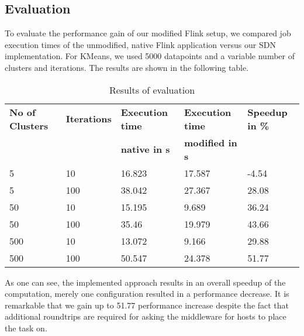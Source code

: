 \subsection{Evaluation}
To evaluate the performance gain of our modified Flink setup, we compared job execution times of the
unmodified, native Flink application versus our SDN implementation. For KMeans, we used 5000
datapoints and a variable number of clusters and iterations. The results are shown in the following
table.

\begin{table}[h]
    \centering
    \begin{tabular}{| l | l | l | l | l | }
        \hline
        \textbf{No of Clusters} & \textbf{Iterations} & \textbf{Execution time}
            & \textbf{Execution time} & \textbf{Speedup in \%} \\
        & & \textbf{native in s} & \textbf{modified in s} & \\ \hline

        5 & 10 & 16.823 & 17.587 & -4.54 \\ \hline
        5 & 100 & 38.042 & 27.367 & 28.08 \\ \hline
        50 &10 &15.195 &9.689 &36.24 \\ \hline
        50 &100 &35.46 &19.979 &43.66 \\ \hline
        500 &10 &13.072 &9.166 &29.88 \\ \hline
        500 &100 &50.547 &24.378 &51.77 \\ \hline
    \end{tabular}
    \caption{Results of evaluation}
    \label{table:guest_properties}
\end{table}

As one can see, the implemented approach results in an overall speedup of the computation, merely
one configuration resulted in a performance decrease. It is remarkable that we gain up to 51.77%
performance increase despite the fact that additional roundtrips are required for asking the
middleware for hosts to place the task on.

